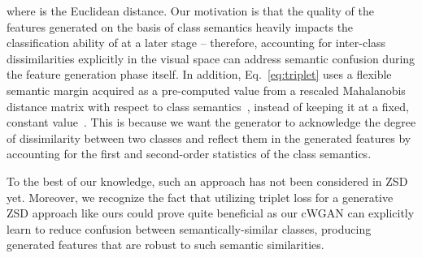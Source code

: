 \documentclass{bmvc2k}
\begin{document}
where  is the Euclidean distance. Our motivation is that the quality of the features generated on the basis of class semantics heavily impacts the classification ability of  at a later stage -- therefore, accounting for inter-class dissimilarities explicitly in the visual space can address semantic confusion during the feature generation phase itself.
In addition, Eq.~\ref{eq:triplet} uses a flexible semantic margin  acquired as a pre-computed value from a rescaled Mahalanobis distance matrix with respect to class semantics~\cite{cacheux2019modeling}, instead of keeping it at a fixed, constant value~\cite{akata2015label, frome2013devise}. This is because we want the generator to acknowledge the degree of dissimilarity between two classes and reflect them in the generated features by accounting for the first and second-order statistics of the class semantics. 

To the best of our knowledge, such an approach has not been considered in ZSD yet. Moreover, we recognize the fact that utilizing triplet loss for a generative ZSD approach like ours could prove quite beneficial as our cWGAN can explicitly learn to reduce confusion between semantically-similar classes, producing generated features that are robust to such semantic similarities.
\end{document}
